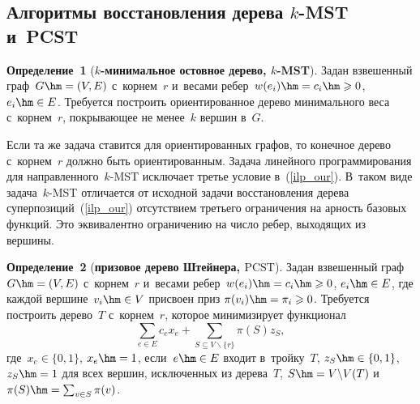 \begin{multicols}{2}
\section{Алгоритмы восстановления дерева $k$-MST и~PCST}

\vspace*{-3pt}

\noindent
\textbf{Определение~1} (\textbf{$k$-минимальное остовное дерево, $k$-MST}).
Задан взвешенный граф~$G\hm=(V,E)$ с~корнем~$r$ и~весами ребер~$w(e_i)\hm=c_i\hm\geqslant 
0$, $e_i\hm\in E$. Требуется построить ориентированное дерево минимального веса 
с~корнем~$r$, покрывающее не менее~$k$ вершин в~$G$.

\smallskip

Если та же задача ставится для ориентированных графов, то конечное дерево 
с~корнем~$r$ должно быть ориентированным. Задача линейного программирования для 
направленного~$k$-MST исключает третье условие в~(\ref{ilp_our}).
В~таком виде задача~$k$-MST отличается от исходной задачи восстановления 
дерева суперпозиций~(\ref{ilp_our}) отсутствием третьего ограничения на арность 
базовых функций. Это эквивалентно ограничению на число ребер, выходящих из 
вершины.

\smallskip

\noindent
\textbf{Определение~2} (\textbf{призовое дерево Штейнера, $\text{PCST}$}).
Задан взвешенный граф $G\hm=(V,E)$ с~корнем~$r$ и~весами ребер~$w(e_i)\hm=c_i\hm\geqslant  0$, $e_i\hm\in E$, где каждой вершине~$v_i \hm\in V$ присвоен 
{приз} $\pi(v_i)\hm=\pi_i\geqslant 0$. Требуется построить дерево~$T$ с~корнем~$r$, 
которое минимизирует функционал
$$
\sum\limits_{e\in E}c_ex_e + \sum\limits_{S\subseteq V\backslash\{r\}} 
\pi(S)z_S,
$$
где~$x_e\in\{0, 1\}$, $x_e\hm=1$, если~$e\hm\in E$ входит в~тройку~$T$, $z_S\hm\in\{0, 1\}$, 
$z_S\hm=1$ для всех вершин, исключенных из дерева~$T$, $S \hm= V\backslash V(T)$ и~$\pi(S)\hm= \sum\nolimits_{v\in S}\pi(v)$.

\smallskip


\end{multicols}
